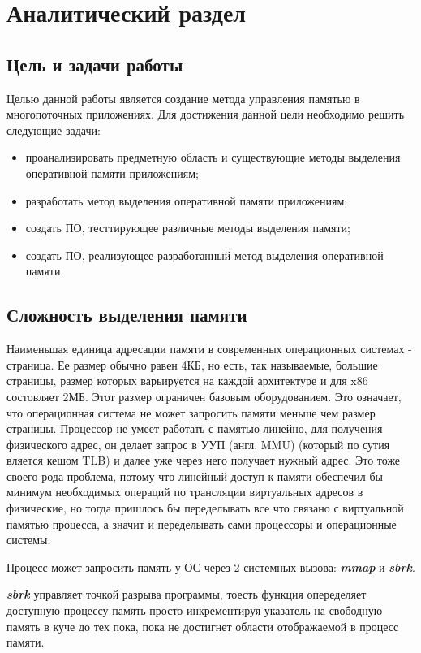 \chapter{Аналитический раздел}
\label{cha:analysis}
\section{Цель и задачи работы}
Целью данной работы является создание метода управления памятью в многопоточных приложениях.
Для достижения данной цели необходимо решить следующие задачи:
\begin{itemize}
	\item проанализировать предметную область и существующие методы выделения оперативной памяти приложениям;
	\item разработать метод выделения оперативной памяти приложениям;
	\item создать ПО, тесттирующее различные методы выделения памяти;
	\item создать ПО, реализующее  разработанный метод выделения оперативной памяти.
\end{itemize}

\section{Сложность выделения памяти}

Наименьшая единица адресации памяти в современных операционных системах - страница. Ее размер обычно равен 4КБ, но есть, так называемые, большие   страницы, размер которых варьируется на каждой архитектуре и для x86 состовляет 2МБ. Этот размер ограничен базовым оборудованием. Это означает, что операционная   система не может запросить памяти меньше чем размер страницы. Процессор не умеет работать с памятью   линейно, для получения физического адрес, он делает запрос в УУП (англ. MMU)   (который   по   сутия вляется кешом TLB) и далее уже через него получает нужный адрес. Это тоже своего рода проблема, потому что линейный доступ к памяти обеспечил бы минимум необходимых операций по трансляции виртуальных адресов в физические, но тогда пришлось бы переделывать все что связано с виртуальной памятью   процесса, а значит и переделывать сами процессоры и операционные системы.

Процесс может запросить память у ОС через 2 системных вызова: \textbf{\textit{mmap}} и \textbf{\textit{sbrk}}.

\textbf{\textit{sbrk}} управляет точкой разрыва программы, тоесть функция   опеределяет доступную процессу память просто инкрементируя указатель на свободную память в куче до тех пока, пока не достигнет области отображаемой в процесс памяти.

